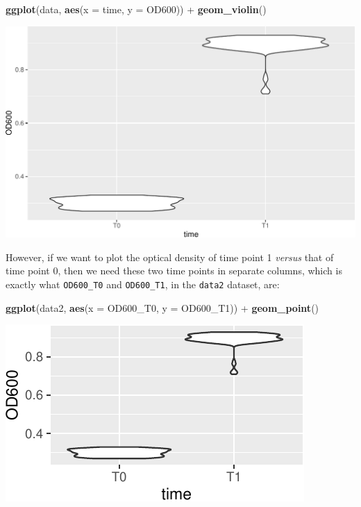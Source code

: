 \documentclass[]{book}
\newenvironment{Shaded}{}{}
\newcommand{\DataTypeTok}[1]{\textcolor[rgb]{0.56,0.13,0.00}{#1}}
\newcommand{\KeywordTok}[1]{\textcolor[rgb]{0.00,0.44,0.13}{\textbf{#1}}}
\newcommand{\NormalTok}[1]{#1}
\newcommand{\OperatorTok}[1]{\textcolor[rgb]{0.40,0.40,0.40}{#1}}
\newcommand{\StringTok}[1]{\textcolor[rgb]{0.25,0.44,0.63}{#1}}
\begin{document}
\begin{Shaded}
\begin{Highlighting}[]
\KeywordTok{ggplot}\NormalTok{(data, }\KeywordTok{aes}\NormalTok{(}\DataTypeTok{x =}\NormalTok{ time, }\DataTypeTok{y =}\NormalTok{ OD600)) }\OperatorTok{+}
\StringTok{  }\KeywordTok{geom_violin}\NormalTok{()}
\end{Highlighting}
\end{Shaded}

\begin{center}\includegraphics[width=\textwidth]{TRES-Tidy-Tutorial_files/figure-latex/unnamed-chunk-135-1} \end{center}

However, if we want to plot the optical density of time point 1 \emph{versus} that of time point 0, then we need these two time points in separate columns, which is exactly what \texttt{OD600\_T0} and \texttt{OD600\_T1}, in the \texttt{data2} dataset, are:

\begin{Shaded}
\begin{Highlighting}[]
\KeywordTok{ggplot}\NormalTok{(data2, }\KeywordTok{aes}\NormalTok{(}\DataTypeTok{x =}\NormalTok{ OD600_T0, }\DataTypeTok{y  =}\NormalTok{ OD600_T1)) }\OperatorTok{+}
\StringTok{  }\KeywordTok{geom_point}\NormalTok{()}
\end{Highlighting}
\end{Shaded}

\begin{center}\includegraphics[width=\textwidth]{TRES-Tidy-Tutorial_files/figure-latex/unnamed-chunk-136-1} \end{center}
\end{document}
